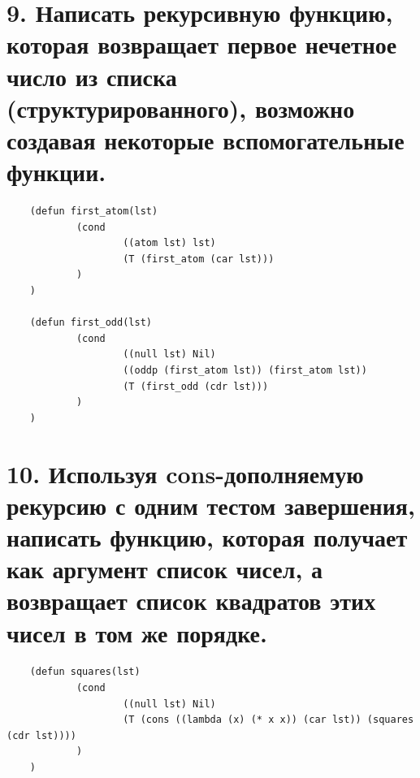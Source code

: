 \documentclass[12pt]{report}
\begin{document}
\section*{9. Написать рекурсивную функцию, которая возвращает первое нечетное число из списка (структурированного), возможно создавая некоторые вспомогательные функции.}

\begin{lstlisting}
	(defun first_atom(lst)
			(cond
					((atom lst) lst)
					(T (first_atom (car lst)))
			)
	)   
	
	(defun first_odd(lst)
			(cond
					((null lst) Nil)
					((oddp (first_atom lst)) (first_atom lst))
					(T (first_odd (cdr lst)))
			)
	)
\end{lstlisting}

\section*{10. Используя cons-дополняемую рекурсию с одним тестом завершения, написать функцию, которая получает как аргумент список чисел, а возвращает список квадратов этих чисел в том же порядке.}

\begin{lstlisting}
	(defun squares(lst)
			(cond
					((null lst) Nil)
					(T (cons ((lambda (x) (* x x)) (car lst)) (squares (cdr lst))))
			)
	)
\end{lstlisting}
\end{document}
